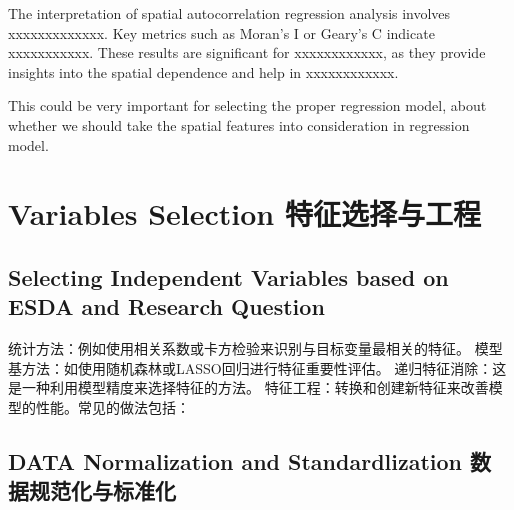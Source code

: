 \documentclass[
]{article}
\begin{document}
The interpretation of spatial autocorrelation regression analysis
involves xxxxxxxxxxxxx. Key metrics such as Moran's I or Geary's C
indicate xxxxxxxxxxx. These results are significant for xxxxxxxxxxxx, as
they provide insights into the spatial dependence and help in
xxxxxxxxxxxx.

This could be very important for selecting the proper regression model,
about whether we should take the spatial features into consideration in
regression model.

\hypertarget{variables-selection-ux7279ux5f81ux9009ux62e9ux4e0eux5de5ux7a0b}{%
\section{Variables Selection
特征选择与工程}\label{variables-selection-ux7279ux5f81ux9009ux62e9ux4e0eux5de5ux7a0b}}

\hypertarget{selecting-independent-variables-based-on-esda-and-research-question}{%
\subsection{Selecting Independent Variables based on ESDA and Research
Question}\label{selecting-independent-variables-based-on-esda-and-research-question}}

统计方法：例如使用相关系数或卡方检验来识别与目标变量最相关的特征。
模型基方法：如使用随机森林或LASSO回归进行特征重要性评估。
递归特征消除：这是一种利用模型精度来选择特征的方法。
特征工程：转换和创建新特征来改善模型的性能。常见的做法包括：

\hypertarget{data-normalization-and-standardlization-ux6570ux636eux89c4ux8303ux5316ux4e0eux6807ux51c6ux5316}{%
\subsection{DATA Normalization and Standardlization
数据规范化与标准化}\label{data-normalization-and-standardlization-ux6570ux636eux89c4ux8303ux5316ux4e0eux6807ux51c6ux5316}}
\end{document}
